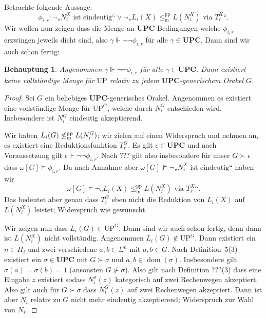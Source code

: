\documentclass[nofonts]{uebung}
\newtheorem{claim}[theorem]{Behauptung}
\def\UP{\ensuremath{\mathrm{UP}}}
\DeclareMathOperator{\dom}{dom}
\def\leqmpp{\ensuremath{\leq_\mathrm{m}^\mathrm{pp}}}
\begin{document}
Betrachte folgende Aussage:
\[ \phi_{i,r}\colon \neg\text{„$N_i^X$ ist eindeutig“} \lor \neg„L_{i}(X)\leqmpp L(N_i^X)\text{ via }T^X_r“. \]
Wir wollen nun zeigen dass die Menge an $\mathbf{UPC}$-Bedingungen welche $\phi_{i,r}$ erzwingen jeweils dicht sind, also $\gamma\Vdash\neg\neg\phi_{i,r}$ für alle $\gamma\in\mathbf{UPC}$.
Dann sind wir auch schon fertig:

\begin{claim}
    Angenommen $\gamma\Vdash\neg\neg\phi_{i,r}$ für alle $\gamma\in\mathbf{UPC}$.
    Dann existiert keine vollständige Menge für $\UP$ relativ zu jedem $\mathbf{UPC}$-generischem Orakel $G$.
\end{claim}
\begin{proof}
    Sei $G$ ein beliebiges $\mathbf{UPC}$-generisches Orakel.
    Angenommen es existiert eine vollständige Menge für $\UP^G$, welche durch $N^G_i$ entschieden wird.
    Insbesondere ist $N^G_i$ eindeutig akzeptierend.

    Wir haben $L_i(G)\not\leqmpp L(N^G_i)$; wir zielen auf einen Widerspruch und nehmen an, es existiert eine Reduktionsfunktion $T_r^G$.
    Es gilt $\epsilon\in\mathbf{UPC}$ und nach Voraussetzung gilt $\epsilon\Vdash\neg\neg\phi_{i,r}$.
    Nach ??? gilt also insbesondere für unser $G\succ\epsilon$ dass $\omega[G] \vDash \phi_{i, r}$.
    Da nach Annahme aber $\omega[G] \not\vDash \neg\text{„$N_i^X$ ist eindeutig“}$ haben wir
    \[ \omega[G] \vDash  \neg„L_{i}(X)\leqmpp L(N_i^X)\text{ via }T^X_r“. \]
    Das bedeutet aber genau dass $T^G_r$ eben nicht die Reduktion von $L_{i}(X)$ auf $L(N_i^X)$ leistet; Widerspruch wie gewünscht.

    Wir zeigen nun dass $L_i(G)\in\UP^G$. Dann sind wir auch schon fertig, denn dann ist $L(N_i^X)$ nicht vollständig.
    Angenommen $L_i(G)\not\in\UP^G$. Dann existiert ein $n\in H_i$ und zwei verschiedene $a,b\in\Sigma^n$ mit $a,b\in G$.
    Nach Definition~5(3) existiert ein $\sigma\in\mathbf{UPC}$ mit $G\succ \sigma$ und $a,b\in\dom(\sigma)$.
    Insbesondere gilt $\sigma(a)=\sigma(b)=1$ (ansonsten $G\not\succ\sigma$).
    Also gilt nach Definition ???(3) dass eine Eingabe $z$ existiert sodass $N_i^\sigma(z)$ kategorisch auf zwei Rechenwegen akzeptiert. 
    Also gilt auch für $G\succ\sigma$ dass $N_i^G(z)$ auf zwei Rechenwegen akzeptiert.
    Dann ist aber $N_i$ relativ zu $G$ nicht mehr eindeutig akzeptierend; Widerspruch zur Wahl von $N_i$.
\end{proof}
\end{document}
